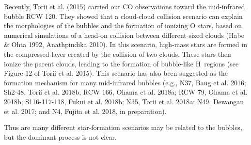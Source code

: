 \documentclass[onecolumn]{pasj01}
\begin{document}

{Recently, Torii et al. (2015) carried out CO observations toward the mid-infrared bubble RCW 120. They {showed} that a cloud-cloud collision scenario can explain the {morphologies} of the bubbles and {{the} formation of} {ionizing O stars}, based on numerical simulation{s} of a head-on collision {between different-sized} clouds (Habe \& Ohta 1992, Anathpindika 2010).
In this scenario, high-mass stars are formed in the compressed layer created by {the} collision of two clouds.
{These stars then}{ ionize the parent clouds{,} leading to {the formation of} bubble-like H\, regions} (see Figure 12 of Torii et al. 2015). 
{This scenario has also been suggested as} the formation mechanism {for} many mid-infrared bubbles (e.g., N37,  Baug et al. 2016; Sh2-48, Torii et al. 2018b; RCW 166, Ohama et al. 2018a; RCW 79, Ohama et al. 2018b; S116-117-118, Fukui et al. 2018b; N35, Torii et al. 2018a; N49, Dewangan et al. 2017; and N4, Fujita et al. 2018, in preparation).

{Thus} are many different star-formation scenarios {may be related to} the bubbles, {but} the dominant process is not clear.

}
\end{document}
